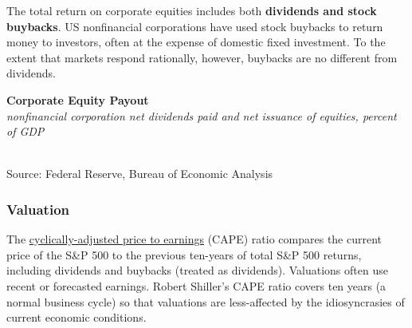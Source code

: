 \documentclass{report}
\makeatletter
\newcommand{\tbllink}[1]{\href{https://raw.githubusercontent.com/bdecon/US-chartbook/master/chartbook/data/#1}{\faTable}}
\newcommand*\short[1]{\expandafter\@gobbletwo\number\numexpr#1\relax}
\newcommand{\sbar}[4]{
		\addplot[ybar stacked, bar width=2.4pt, draw opacity=0, fill=#1] 
			table [x=#2, y=#3, col sep=comma]{#4};}
\newcommand{\dateaxisticks}{
		date coordinates in=x, axis line style={draw=none},
		xmax={2023-02-15},
		max space between ticks=40,	    
		xtick={{1990-01-01}, {1992-01-01}, {1994-01-01}, 
			{1996-01-01}, {1998-01-01}, {2000-01-01}, 
			{2002-01-01}, {2004-01-01}, {2006-01-01},
			{2008-01-01}, {2010-01-01}, {2012-01-01}, {2014-01-01},
		    {2016-01-01}, {2018-01-01}, {2020-01-01}, {2022-01-01}, 
		    {2024-01-01}, {2026-01-01}},
		minor xtick={{1989-01-01}, {1991-01-01}, {1993-01-01},
			{1995-01-01}, {1997-01-01}, {1999-01-01}, 
			{2001-01-01}, {2003-01-01}, {2005-01-01}, {2007-01-01},
		    {2009-01-01}, {2011-01-01}, {2013-01-01}, {2015-01-01},
		    {2017-01-01}, {2019-01-01}, {2021-01-01}, {2023-01-01}, 
		    {2025-01-01}, {2027-01-01}},
		enlarge y limits={0.06}, enlarge x limits={0.01},
		}
\newcommand{\bbar}[2]{extra #1 ticks = {{#2}}, extra #1 tick labels = ,
		extra #1 tick style = {grid=major, grid style={thick, black!25}},}
\newcommand{\rbars}{
		\fill[color=black!10] (axis cs:{1990-07-01},\pgfkeysvalueof{/pgfplots/ymin}) rectangle 
			(axis cs:{1991-03-01}, \pgfkeysvalueof{/pgfplots/ymax});
		\fill[color=black!10] (axis cs:{2007-12-01},\pgfkeysvalueof{/pgfplots/ymin}) rectangle 
			(axis cs:{2009-07-01}, \pgfkeysvalueof{/pgfplots/ymax});
		\fill[color=black!10] (axis cs:{2001-03-01},\pgfkeysvalueof{/pgfplots/ymin}) rectangle 
			(axis cs:{2001-11-01}, \pgfkeysvalueof{/pgfplots/ymax});
		\fill[color=black!10] (axis cs:{2020-02-01},\pgfkeysvalueof{/pgfplots/ymin}) rectangle 
			(axis cs:{2020-05-01}, \pgfkeysvalueof{/pgfplots/ymax});}
\makeatother
\begin{document}
{\begin{minipage}{0.76\textwidth}
\small The total return on corporate equities includes both \textbf{dividends and stock buybacks}. US nonfinancial corporations have used stock buybacks to return money to investors, often at the expense of domestic fixed investment. To the extent that markets respond rationally, however, buybacks are no different from dividends. 


\vspace{1mm}

\normalsize \textbf{Corporate Equity Payout}\\
\footnotesize{\textit{nonfinancial corporation net dividends paid and net issuance of equities, percent of GDP}}\\
\hspace*{-2mm} \\
\footnotesize{Source: Federal Reserve, Bureau of Economic Analysis} \hfill \tbllink{eq_payout.csv}
\end{minipage}
\newpage
\begin{minipage}{0.76\textwidth}
\subsubsection*{Valuation}
\small The \href{http://www.econ.yale.edu/~shiller/data.htm}{cyclically-adjusted price to earnings} (CAPE) ratio compares the current price of the S\&P 500 to the previous ten-years of total S\&P 500 returns, including dividends and buybacks (treated as dividends). Valuations often use recent or forecasted earnings. Robert Shiller's CAPE ratio covers ten years (a normal business cycle) so that valuations are less-affected by the idiosyncrasies of current economic conditions. 


\vspace{1mm}


\end{minipage}}
\end{document}
